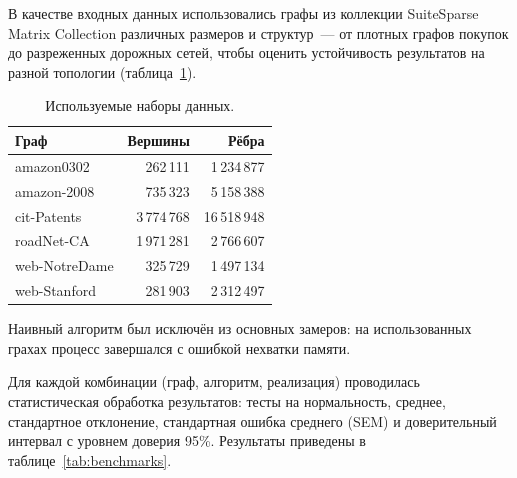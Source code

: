\documentclass[a4paper]{article}
\begin{document}
В качестве входных данных использовались графы из коллекции SuiteSparse Matrix Collection различных размеров и структур~--- от плотных графов покупок до разреженных дорожных сетей, чтобы оценить устойчивость результатов на разной топологии (таблица~\ref{tab:datasets}).

\begin{table}[h!]
    \centering
    \caption{Используемые наборы данных.}
    \label{tab:datasets}
    \begin{tabular}{lrr}
        \toprule
        \textbf{Граф} & \textbf{Вершины} & \textbf{Рёбра} \\
        \midrule
        amazon0302    & 262\,111    & 1\,234\,877  \\
        amazon-2008   & 735\,323    & 5\,158\,388  \\
        cit-Patents   & 3\,774\,768 & 16\,518\,948 \\
        roadNet-CA    & 1\,971\,281 & 2\,766\,607  \\
        web-NotreDame & 325\,729    & 1\,497\,134  \\
        web-Stanford  & 281\,903    & 2\,312\,497  \\
        \bottomrule
    \end{tabular}
\end{table}

Наивный алгоритм был исключён из основных замеров: на использованных грахах процесс завершался с ошибкой нехватки памяти.

Для каждой комбинации (граф, алгоритм, реализация) проводилась статистическая обработка результатов: тесты на нормальность, среднее, стандартное отклонение, стандартная ошибка среднего (SEM) и доверительный интервал с уровнем доверия 95\%.
Результаты приведены в таблице~\ref{tab:benchmarks}.
\end{document}
